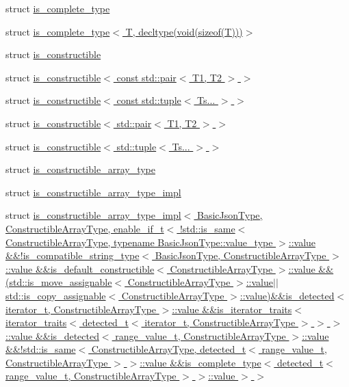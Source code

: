 \begin{DoxyCompactItemize}
struct \hyperlink{structnlohmann_1_1detail_1_1is__complete__type}{is\+\_\+complete\+\_\+type}
\item 
struct \hyperlink{structnlohmann_1_1detail_1_1is__complete__type_3_01T_00_01decltype_07void_07sizeof_07T_08_08_08_4}{is\+\_\+complete\+\_\+type$<$ T, decltype(void(sizeof(\+T)))$>$}
\item 
struct \hyperlink{structnlohmann_1_1detail_1_1is__constructible}{is\+\_\+constructible}
\item 
struct \hyperlink{structnlohmann_1_1detail_1_1is__constructible_3_01const_01std_1_1pair_3_01T1_00_01T2_01_4_01_4}{is\+\_\+constructible$<$ const std\+::pair$<$ T1, T2 $>$ $>$}
\item 
struct \hyperlink{structnlohmann_1_1detail_1_1is__constructible_3_01const_01std_1_1tuple_3_01Ts_8_8_8_01_4_01_4}{is\+\_\+constructible$<$ const std\+::tuple$<$ Ts... $>$ $>$}
\item 
struct \hyperlink{structnlohmann_1_1detail_1_1is__constructible_3_01std_1_1pair_3_01T1_00_01T2_01_4_01_4}{is\+\_\+constructible$<$ std\+::pair$<$ T1, T2 $>$ $>$}
\item 
struct \hyperlink{structnlohmann_1_1detail_1_1is__constructible_3_01std_1_1tuple_3_01Ts_8_8_8_01_4_01_4}{is\+\_\+constructible$<$ std\+::tuple$<$ Ts... $>$ $>$}
\item 
struct \hyperlink{structnlohmann_1_1detail_1_1is__constructible__array__type}{is\+\_\+constructible\+\_\+array\+\_\+type}
\item 
struct \hyperlink{structnlohmann_1_1detail_1_1is__constructible__array__type__impl}{is\+\_\+constructible\+\_\+array\+\_\+type\+\_\+impl}
\item 
struct \hyperlink{structnlohmann_1_1detail_1_1is__constructible__array__type__impl_3_01BasicJsonType_00_01Construc9fb32d79d2f03f291695c23371cb431d}{is\+\_\+constructible\+\_\+array\+\_\+type\+\_\+impl$<$ Basic\+Json\+Type, Constructible\+Array\+Type, enable\+\_\+if\+\_\+t$<$ !std\+::is\+\_\+same$<$ Constructible\+Array\+Type, typename Basic\+Json\+Type\+::value\+\_\+type $>$\+::value \&\&!is\+\_\+compatible\+\_\+string\+\_\+type$<$ Basic\+Json\+Type, Constructible\+Array\+Type $>$\+::value \&\&is\+\_\+default\+\_\+constructible$<$ Constructible\+Array\+Type $>$\+::value \&\&(std\+::is\+\_\+move\+\_\+assignable$<$ Constructible\+Array\+Type $>$\+::value$\vert$$\vert$std\+::is\+\_\+copy\+\_\+assignable$<$ Constructible\+Array\+Type $>$\+::value)\&\&is\+\_\+detected$<$ iterator\+\_\+t, Constructible\+Array\+Type $>$\+::value \&\&is\+\_\+iterator\+\_\+traits$<$ iterator\+\_\+traits$<$ detected\+\_\+t$<$ iterator\+\_\+t, Constructible\+Array\+Type $>$ $>$ $>$\+::value \&\&is\+\_\+detected$<$ range\+\_\+value\+\_\+t, Constructible\+Array\+Type $>$\+::value \&\&!std\+::is\+\_\+same$<$ Constructible\+Array\+Type, detected\+\_\+t$<$ range\+\_\+value\+\_\+t, Constructible\+Array\+Type $>$ $>$\+::value \&\&is\+\_\+complete\+\_\+type$<$ detected\+\_\+t$<$ range\+\_\+value\+\_\+t, Constructible\+Array\+Type $>$ $>$\+::value $>$ $>$}

\end{DoxyCompactItemize}
